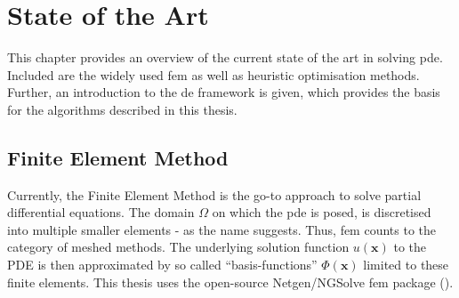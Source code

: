 \documentclass[./\jobname.tex]{subfiles}
\begin{document}
\chapter{State of the Art}
\label{chap:state_of_the_art}
This chapter provides an overview of the current state of the art in solving \gls{pde}. Included are the widely used \gls{fem} as well as heuristic optimisation methods. Further, an introduction to the \gls{de} framework is given, which provides the basis for the algorithms described in this thesis. 

\section{Finite Element Method}
Currently, the Finite Element Method is the go-to approach to solve partial differential equations. The domain $\Omega$ on which the \gls{pde} is posed, is discretised into multiple smaller elements - as the name suggests. Thus, \gls{fem} counts to the category of meshed methods. The underlying solution function $u(\mathbf{x})$ to the PDE is then approximated by so called ``basis-functions'' $\Phi(\mathbf{x})$ limited to these finite elements. This thesis uses the open-source Netgen/NGSolve \gls{fem} package (\cite{schoberl_ngsolvengsolve_2020}). 
\end{document}
